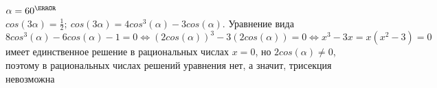 $\alpha = 60^\degree$ \\ $cos (3\alpha) = \frac{1}{2}; \ cos(3\alpha) = 4cos^3(\alpha) - 3cos(\alpha)$. Уравнение вида $8cos^3(\alpha) - 6cos(\alpha) - 1 = 0 \Longleftrightarrow (2cos(\alpha))^3 - 3(2cos(\alpha)) = 0  \Longleftrightarrow x^3 - 3x = x(x^2 - 3) = 0$ имеет единственное решение в рациональных числах $x = 0$, но $2cos(\alpha) \neq 0$, поэтому в рациональных числах решений уравнения нет, а значит, трисекция невозможна  